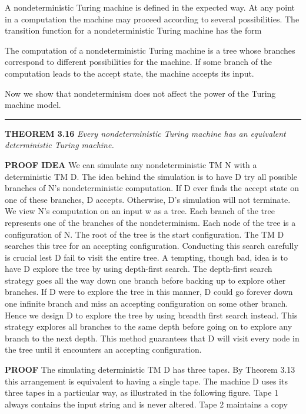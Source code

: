 \documentclass[main.tex]{subfiles}
\begin{document}
A nondeterministic Turing machine is defined in the expected way. At any point
in a computation the machine may proceed according to several possibilities.
The transition function for a nondeterministic Turing machine has the form
\par The computation of a nondeterministic Turing machine is a tree whose branches
correspond to different possibilities for the machine. 
If some branch of the computation leads to the accept state, the machine accepts its input. 
\par Now we show that nondeterminism does not affect the power of the Turing machine model. 
\par\rule{\textwidth}{0.4pt}
\textbf{THEOREM 3.16} \textit{Every nondeterministic Turing machine has an equivalent deterministic Turing
machine.}
\par\textbf{PROOF IDEA} We can simulate any nondeterministic TM N with a deterministic TM D. The idea behind the simulation is to have D try all possible branches
of N’s nondeterministic computation. If D ever finds the accept state on one of
these branches, D accepts. Otherwise, D’s simulation will not terminate.
We view N’s computation on an input w as a tree. Each branch of the tree
represents one of the branches of the nondeterminism. Each node of the tree
is a configuration of N. The root of the tree is the start configuration. The
TM D searches this tree for an accepting configuration. Conducting this search
carefully is crucial lest D fail to visit the entire tree. A tempting, though bad,
idea is to have D explore the tree by using depth-first search. The depth-first
search strategy goes all the way down one branch before backing up to explore
other branches. If D were to explore the tree in this manner, D could go forever
down one infinite branch and miss an accepting configuration on some other
branch. Hence we design D to explore the tree by using breadth first search
instead. This strategy explores all branches to the same depth before going on
to explore any branch to the next depth. This method guarantees that D will
visit every node in the tree until it encounters an accepting configuration. 
\par\textbf{PROOF } The simulating deterministic TM D has three tapes. By Theorem 3.13 this arrangement is equivalent to having a single tape. The machine D
uses its three tapes in a particular way, as illustrated in the following figure. Tape
1 always contains the input string and is never altered. Tape 2 maintains a copy
\end{document}
